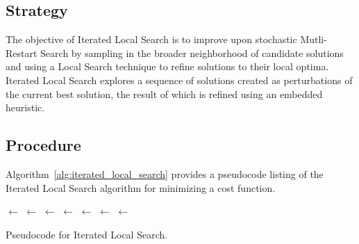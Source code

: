 \subsection{Strategy}
The objective of Iterated Local Search is to improve upon stochastic Mutli-Restart Search by sampling in the broader neighborhood of candidate solutions and using a Local Search technique to refine solutions to their local optima.
Iterated Local Search explores a sequence of solutions created as perturbations of the current best solution, the result of which is refined using an embedded heuristic.

\subsection{Procedure}
Algorithm~\ref{alg:iterated_local_search} provides a pseudocode listing of the Iterated Local Search algorithm for minimizing a cost function.

\begin{algorithm}[htp]
	\SetLine
	\KwIn{}
	\KwOut{\Best}
	\Best $\leftarrow$ \ConstructInitialSolution{}\;
	\Best $\leftarrow$ \LocalSearch{}\;
	\SearchHistory $\leftarrow$ \Best\;
	\While{$\neg$ \StopCondition{}} {
		\Candidate $\leftarrow$ \Perturbation{\Best, \SearchHistory}\;
		\Candidate $\leftarrow$ \LocalSearch{\Candidate}\;
		\SearchHistory $\leftarrow$ \Candidate\;
		\If{\AcceptanceCriterion{\Best, \Candidate, \SearchHistory}} {
			\Best $\leftarrow$ \Candidate\;
		}
	}
	\Return{\Best}\;
	\caption{Pseudocode for Iterated Local Search.}
	\label{alg:iterated_local_search}
\end{algorithm}

